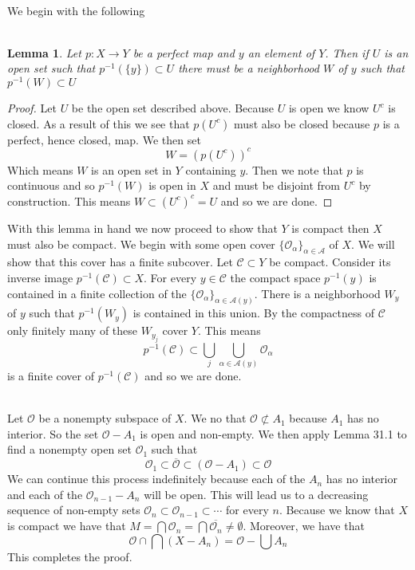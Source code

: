 \documentclass{article}
\newcommand{\problem}[1]{\noindent{\textbf{Problem #1}}\\}
\newtheorem*{lem}{\\ Lemma}
\begin{document}
\problem{3.26.12} We begin with the following
\begin{lem}
Let $p: X \to Y$ be a perfect map and $y$ an element of $Y$. Then if $U$ is an open set such that $p^{-1}(\{y\}) \subset U$ there must be a neighborhood $W$ of $y$ such that $p^{-1}(W) \subset U$
\end{lem}
\begin{proof}
Let $U$ be the open set described above. Because $U$ is open we know $U^c$ is closed. As a result of this we see that $p(U^c)$ must also be closed because $p$ is a perfect, hence closed, map. We then set 
\[
W = (p(U^c))^c
\] 
Which means $W$ is an open set in $Y$ containing $y$. Then we note that $p$ is continuous and so $p^{-1}(W)$ is open in $X$ and must be disjoint from $U^c$ by construction. This means $W \subset (U^c)^c = U$ and so we are done.  
\end{proof}
With this lemma in hand we now proceed to show that $Y$ is compact then $X$ must also be compact. We begin with some open cover $\{\mathcal{O}_\alpha\}_{\alpha \in \mathcal{A}}$ of $X$. We will show that this cover has a finite subcover. Let $\mathcal{C} \subset Y$ be compact. Consider its inverse image $p^{-1}(\mathcal{C}) \subset X$. For every $y \in \mathcal{C}$ the compact space $p^{-1}(y)$ is contained in a finite collection of the $\{\mathcal{O}_\alpha\}_{\alpha \in \mathcal{A}(y)}$. There is a neighborhood $W_y$ of $y$ such that $p^{-1}(W_y)$ is contained in this union. By the compactness of $\mathcal{C}$ only finitely many of these $W_{y_j}$ cover $Y$. This means
\[
p^{-1}(\mathcal{C}) \subset \bigcup_j \bigcup_{\alpha \in \mathcal{A}(y)} \mathcal{O}_{\alpha}
\]
is a finite cover of $p^{-1}(\mathcal{C})$ and so we are done. 
 
\problem{3.27.5} Let $\mathcal{O}$ be a nonempty subspace of $X$. We no that $\mathcal{O} \not\subset A_1$ because $A_1$ has no interior. So the set $\mathcal{O} - A_1$ is open and non-empty. We then apply Lemma 31.1 to find a nonempty open set $\mathcal{O}_1$ such that
\[
\mathcal{O}_1 \subset \overline{\mathcal{O}} \subset (\mathcal{O} - A_1) \subset \mathcal{O}
\]
We can continue this process indefinitely because each of the $A_n$ has no interior and each of the $\mathcal{O}_{n-1} - A_n$ will be open.  This will lead us to a decreasing sequence of non-empty sets $\mathcal{O}_n \subset \mathcal{O}_{n-1} \subset \cdots$ for every $n$. Because we know that $X$ is compact we have that $M = \bigcap \mathcal{O}_n = \bigcap\overline{\mathcal{O}_n} \neq \emptyset$. Moreover, we have that
\[
\mathcal{O} \cap \bigcap (X - A_n) = \mathcal{O} - \bigcup A_n
\]
This completes the proof. 
\end{document}
